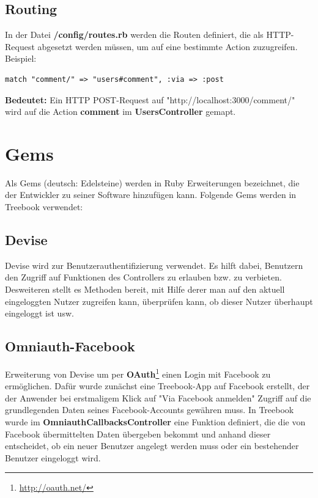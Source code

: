 \documentclass[10pt,a4paper]{book}
\begin{document}
\subsection{Routing}
In der Datei \textbf{/config/routes.rb} werden die Routen definiert, die als HTTP-Request abgesetzt werden müssen, um auf eine bestimmte Action zuzugreifen.
Beispiel:
\begin{lstlisting}
match "comment/" => "users#comment", :via => :post
\end{lstlisting}
\textbf{Bedeutet:} Ein HTTP POST-Request auf "http://localhost:3000/comment/" wird auf die Action \textbf{comment} im \textbf{UsersController} gemapt.
\section{Gems}
Als Gems (deutsch: Edelsteine) werden in Ruby Erweiterungen bezeichnet, die der Entwickler zu seiner Software hinzufügen kann. Folgende Gems werden in Treebook verwendet:
\subsection{Devise}
Devise wird zur Benutzerauthentifizierung verwendet. Es hilft dabei, Benutzern den Zugriff auf Funktionen des Controllers zu erlauben bzw. zu verbieten. Desweiteren stellt es Methoden bereit, mit Hilfe derer man auf den aktuell eingeloggten Nutzer zugreifen kann, überprüfen kann, ob dieser Nutzer überhaupt eingeloggt ist usw.
\subsection{Omniauth-Facebook}
Erweiterung von Devise um per \textbf{OAuth}\footnote{\href{http://oauth.net/}{http://oauth.net/}} einen Login mit Facebook zu ermöglichen. 
Dafür wurde zunächst eine Treebook-App auf Facebook erstellt, der der Anwender bei erstmaligem Klick auf "Via Facebook anmelden" Zugriff auf 
die grundlegenden Daten seines Facebook-Accounts gewähren muss. In Treebook wurde im \textbf{OmniauthCallbacksController} eine Funktion 
definiert, die die von Facebook übermittelten Daten übergeben bekommt und anhand dieser entscheidet, ob ein neuer Benutzer angelegt werden muss oder ein bestehender Benutzer eingeloggt wird.
\end{document}
